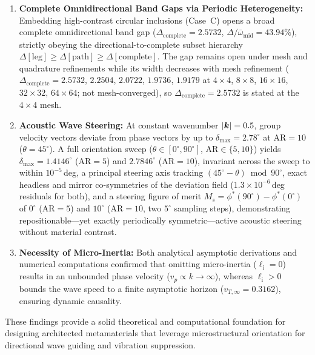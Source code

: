 \begin{enumerate}
  \item \textbf{Complete Omnidirectional Band Gaps via Periodic Heterogeneity:} Embedding high-contrast circular inclusions (Case~C) opens a broad complete omnidirectional band gap ($\Delta_{\mathrm{complete}} = 2.5732$, $\Delta/\bar{\omega}_{\mathrm{mid}} = 43.94\%$), strictly obeying the directional-to-complete subset hierarchy $\Delta[\mathrm{leg}] \ge \Delta[\mathrm{path}] \ge \Delta[\mathrm{complete}]$. The gap remains open under mesh and quadrature refinements while its width decreases with mesh refinement ($\Delta_{\mathrm{complete}} = 2.5732$, $2.2504$, $2.0722$, $1.9736$, $1.9179$ at $4\times 4$, $8\times 8$, $16\times 16$, $32\times 32$, $64\times 64$; not mesh-converged), so $\Delta_{\mathrm{complete}} = 2.5732$ is stated at the $4\times 4$ mesh.
  \item \textbf{Acoustic Wave Steering:} At constant wavenumber $|\bm{k}| = 0.5$, group velocity vectors deviate from phase vectors by up to $\delta_{\max} = 2.78^\circ$ at $\mathrm{AR} = 10$ ($\theta = 45^\circ$). A full orientation sweep ($\theta \in [0^\circ, 90^\circ]$, $\mathrm{AR} \in \{5, 10\}$) yields $\delta_{\max} = 1.4146^\circ$ ($\mathrm{AR}=5$) and $2.7846^\circ$ ($\mathrm{AR}=10$), invariant across the sweep to within $10^{-5}\,$deg, a principal steering axis tracking $(45^\circ-\theta) \bmod 90^\circ$, exact headless and mirror co-symmetries of the deviation field ($1.3\times10^{-6}\,$deg residuals for both), and a steering figure of merit $M_s = \phi^*(90^\circ) - \phi^*(0^\circ)$ of $0^\circ$ ($\mathrm{AR}=5$) and $10^\circ$ ($\mathrm{AR}=10$, two $5^\circ$ sampling steps), demonstrating repositionable---yet exactly periodically symmetric---active acoustic steering without material contrast.
  \item \textbf{Necessity of Micro-Inertia:} Both analytical asymptotic derivations and numerical computations confirmed that omitting micro-inertia ($\ell_{\mathrm{i}} = 0$) results in an unbounded phase velocity ($v_p \propto k \to \infty$), whereas $\ell_{\mathrm{i}} > 0$ bounds the wave speed to a finite asymptotic horizon ($v_{T,\infty} = 0.3162$), ensuring dynamic causality.
\end{enumerate}

These findings provide a solid theoretical and computational foundation for designing architected metamaterials that leverage microstructural orientation for directional wave guiding and vibration suppression.
